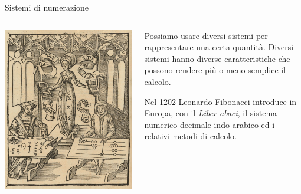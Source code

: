 \documentclass[aspectratio=169]{beamer}
\begin{document}
\begin{frame}{Sistemi di numerazione}
    \begin{columns}
        \begin{column}{0.4\textwidth}
            \includegraphics[width=0.9\linewidth]{algoristi_abacisti.jpg}
        \end{column}
        \begin{column}{0.5\textwidth}
            Possiamo usare diversi sistemi per rappresentare una certa quantità. Diversi sistemi hanno diverse caratteristiche che possono rendere più o meno semplice il calcolo.

            Nel 1202 Leonardo Fibonacci introduce in Europa, con il \emph{Liber abaci}, il sistema numerico decimale indo-arabico ed i relativi metodi di calcolo.

        \end{column}
    \end{columns}
\end{frame}
\end{document}
